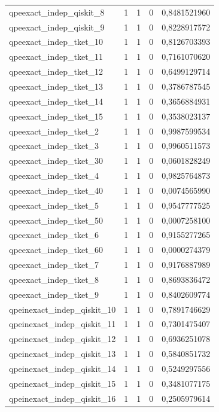 \begin{longtable}{lrrrr}
qpeexact\_indep\_qiskit\_8 & 1 & 1 & 0 & 0,8481521960 \\
qpeexact\_indep\_qiskit\_9 & 1 & 1 & 0 & 0,8228917572 \\
qpeexact\_indep\_tket\_10 & 1 & 1 & 0 & 0,8126703393 \\
qpeexact\_indep\_tket\_11 & 1 & 1 & 0 & 0,7161070620 \\
qpeexact\_indep\_tket\_12 & 1 & 1 & 0 & 0,6499129714 \\
qpeexact\_indep\_tket\_13 & 1 & 1 & 0 & 0,3786787545 \\
qpeexact\_indep\_tket\_14 & 1 & 1 & 0 & 0,3656884931 \\
qpeexact\_indep\_tket\_15 & 1 & 1 & 0 & 0,3538023137 \\
qpeexact\_indep\_tket\_2 & 1 & 1 & 0 & 0,9987599534 \\
qpeexact\_indep\_tket\_3 & 1 & 1 & 0 & 0,9960511573 \\
qpeexact\_indep\_tket\_30 & 1 & 1 & 0 & 0,0601828249 \\
qpeexact\_indep\_tket\_4 & 1 & 1 & 0 & 0,9825764873 \\
qpeexact\_indep\_tket\_40 & 1 & 1 & 0 & 0,0074565990 \\
qpeexact\_indep\_tket\_5 & 1 & 1 & 0 & 0,9547777525 \\
qpeexact\_indep\_tket\_50 & 1 & 1 & 0 & 0,0007258100 \\
qpeexact\_indep\_tket\_6 & 1 & 1 & 0 & 0,9155277265 \\
qpeexact\_indep\_tket\_60 & 1 & 1 & 0 & 0,0000274379 \\
qpeexact\_indep\_tket\_7 & 1 & 1 & 0 & 0,9176887989 \\
qpeexact\_indep\_tket\_8 & 1 & 1 & 0 & 0,8693836472 \\
qpeexact\_indep\_tket\_9 & 1 & 1 & 0 & 0,8402609774 \\
qpeinexact\_indep\_qiskit\_10 & 1 & 1 & 0 & 0,7891746629 \\
qpeinexact\_indep\_qiskit\_11 & 1 & 1 & 0 & 0,7301475407 \\
qpeinexact\_indep\_qiskit\_12 & 1 & 1 & 0 & 0,6936251078 \\
qpeinexact\_indep\_qiskit\_13 & 1 & 1 & 0 & 0,5840851732 \\
qpeinexact\_indep\_qiskit\_14 & 1 & 1 & 0 & 0,5249297556 \\
qpeinexact\_indep\_qiskit\_15 & 1 & 1 & 0 & 0,3481077175 \\
qpeinexact\_indep\_qiskit\_16 & 1 & 1 & 0 & 0,2505979614 \\

\end{longtable}
